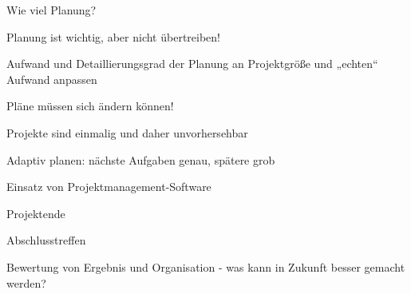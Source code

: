\documentclass[a4paper]{article}
\begin{document}
\begin{multicols}{3}
  Wie viel Planung?
  \begin{itemize*}
    \item Planung ist wichtig, aber nicht übertreiben!
    \item Aufwand und Detaillierungsgrad der Planung an Projektgröße und „echten“ Aufwand anpassen
    \item Pläne müssen sich ändern können!
          \begin{itemize*}
            \item Projekte sind einmalig und daher unvorhersehbar
          \end{itemize*}
    \item Adaptiv planen: nächste Aufgaben genau, spätere grob
    \item Einsatz von Projektmanagement-Software
    \item Projektende
          \begin{itemize*}
            \item Abschlusstreffen
            \item Bewertung von Ergebnis und Organisation - was kann in Zukunft besser gemacht werden?
          \end{itemize*}
  \end{itemize*}

\end{multicols}
\end{document}
